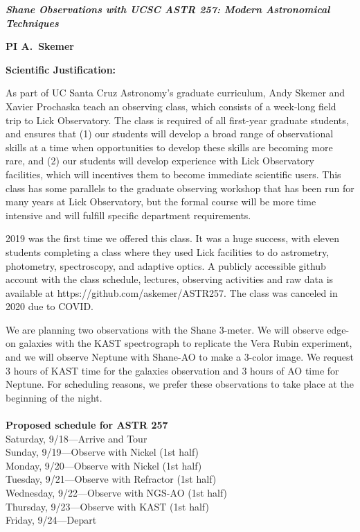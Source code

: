 \documentclass[12pt]{article}
\begin{document}
\noindent
\centerline{\bf \textit{Shane Observations with UCSC ASTR 257: Modern Astronomical Techniques}} 
\centerline{\bf PI A.\ Skemer}

\vskip 15pt

\centerline{\bf  Scientific Justification: }

As part of UC Santa Cruz Astronomy's graduate curriculum, Andy Skemer and Xavier Prochaska teach an observing class, which consists of a week-long field trip to Lick Observatory.  The class is required of all first-year graduate students, and ensures that (1) our students will develop a broad range of observational skills at a time when opportunities to develop these skills are becoming more rare, and (2) our students will develop experience with Lick Observatory facilities, which will incentives them to become immediate scientific users.  This class has some parallels to the graduate observing workshop that has been run for many years at Lick Observatory, but the formal course will be more time intensive and will fulfill specific department requirements.

2019 was the first time we offered this class.  It was a huge success, with eleven students completing a class where they used Lick facilities to do astrometry, photometry, spectroscopy, and adaptive optics.  A publicly accessible github account with the class schedule, lectures, observing activities and raw data is available at https://github.com/askemer/ASTR257.  The class was canceled in 2020 due to COVID.

We are planning two observations with the Shane 3-meter.  We will observe edge-on galaxies with the KAST spectrograph to replicate the Vera Rubin experiment, and we will observe Neptune with Shane-AO to make a 3-color image.  We request 3 hours of KAST time for the galaxies observation and 3 hours of AO time for Neptune.  For scheduling reasons, we prefer these observations to take place at the beginning of the night.
\\\\
\textbf{Proposed schedule for ASTR 257}\\
Saturday, 9/18—Arrive and Tour\\
Sunday, 9/19—Observe with Nickel (1st half)\\
Monday, 9/20—Observe with Nickel (1st half)\\
Tuesday, 9/21—Observe with Refractor (1st half)\\
Wednesday, 9/22—Observe with NGS-AO (1st half)\\
Thursday, 9/23—Observe with KAST (1st half)\\
Friday, 9/24—Depart
\end{document}
